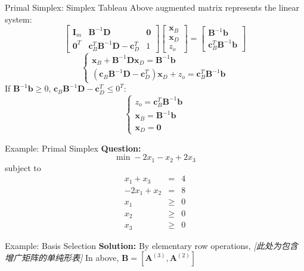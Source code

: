 \documentclass[aspectratio=169,hyperref,UTF8,CJK]{beamer}
\begin{document}
\begin{frame}{Primal Simplex: Simplex Tableau}
Above augmented matrix represents the linear system:
\[
\begin{bmatrix}
\mathbf{I}_m & \mathbf{B}^{-1}\mathbf{D} & \mathbf{0} \\
\mathbf{0}^T & \mathbf{c}_B^T\mathbf{B}^{-1}\mathbf{D} - \mathbf{c}_D^T & 1
\end{bmatrix}
\begin{bmatrix}
\mathbf{x}_B \\
\mathbf{x}_D \\
z_o
\end{bmatrix}
=
\begin{bmatrix}
\mathbf{B}^{-1}\mathbf{b} \\
\mathbf{c}_B^T\mathbf{B}^{-1}\mathbf{b}
\end{bmatrix}
\]
\[\begin{cases}
\mathbf{x}_B + \mathbf{B}^{-1}\mathbf{D}\mathbf{x}_D = \mathbf{B}^{-1}\mathbf{b} \\
(\mathbf{c}_B\mathbf{B}^{-1}\mathbf{D} - \mathbf{c}_D^T)\mathbf{x}_D + z_o = \mathbf{c}_B^T\mathbf{B}^{-1}\mathbf{b}
\end{cases}\]
If \(\mathbf{B}^{-1}\mathbf{b} \ge 0\), \(\mathbf{c}_B\mathbf{B}^{-1}\mathbf{D} - \mathbf{c}_D^T \le 0^T\):
\[\begin{cases}
z_o = \mathbf{c}_B^T \mathbf{B}^{-1} \mathbf{b} \\
\mathbf{x}_B = \mathbf{B}^{-1} \mathbf{b} \\
\mathbf{x}_D = \mathbf{0}
\end{cases}\]
\end{frame}

\begin{frame}{Example: Primal Simplex}
\textbf{Question:}
\[
\min -2x_1 - x_2 + 2x_3
\]
subject to
\[\begin{array}{rcl} x_1 + x_3 & = & 4 \\ -2x_1 + x_2 & = & 8 \\ x_1 & \geq & 0 \\ x_2 & \geq & 0 \\ x_3 & \geq & 0 \end{array}\]
\end{frame}

\begin{frame}{Example: Basis Selection}
\textbf{Solution:} By elementary row operations,
\textit{[此处为包含增广矩阵的单纯形表]}
In above, \(\mathbf{B} = [\mathbf{A}^{(3)},\mathbf{A}^{(2)}]\)
\end{frame}
\end{document}
